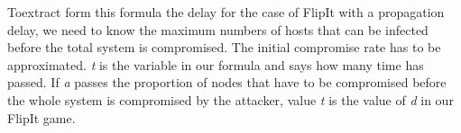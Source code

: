 Toextract form this formula the delay for the case of FlipIt with a propagation delay, we need to know the maximum numbers of hosts that can be infected before the total system is compromised. The initial compromise rate has to be approximated. \textit{t} is the variable in our formula and says how many time has passed. If \textit{a} passes the proportion of nodes that have to be compromised before the whole system is compromised by the attacker, value \textit{t}  is the value of \textit{d} in our FlipIt game.

%

